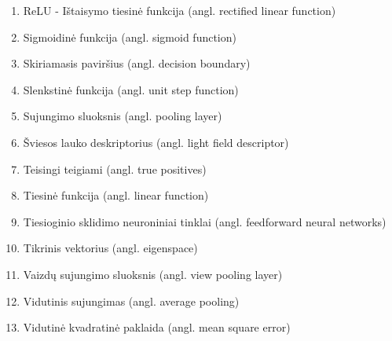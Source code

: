 \begin{enumerate}
	\item ReLU - Ištaisymo tiesinė funkcija (angl. rectified linear function)
	\item Sigmoidinė funkcija (angl. sigmoid function)
	\item Skiriamasis paviršius (angl. decision boundary)
	\item Slenkstinė funkcija (angl. unit step function)
	\item Sujungimo sluoksnis (angl. pooling layer)
	\item Šviesos lauko deskriptorius (angl. light field descriptor)
	\item Teisingi teigiami (angl. true positives)
	\item Tiesinė funkcija (angl. linear function)
	\item Tiesioginio sklidimo neuroniniai tinklai (angl. feedforward neural networks)
	\item Tikrinis vektorius (angl. eigenspace)
	\item Vaizdų sujungimo sluoksnis (angl. view pooling layer)
	\item Vidutinis sujungimas (angl. average pooling)
	\item Vidutinė kvadratinė paklaida (angl. mean square error)
\end{enumerate}